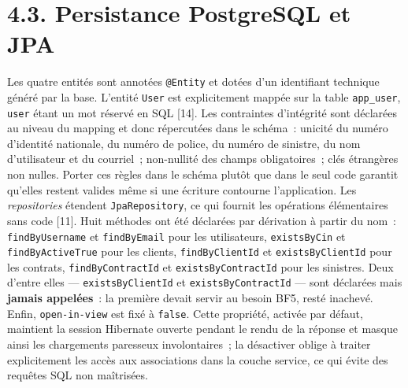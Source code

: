 \documentclass[12pt,a4paper]{report}
\begin{document}
\section*{4.3. Persistance PostgreSQL et JPA}
Les quatre entités sont annotées \texttt{@Entity} et dotées d'un identifiant technique généré par la base. L'entité \texttt{User} est explicitement mappée sur la table \texttt{app\_user}, \texttt{user} étant un mot réservé en SQL [14]. Les contraintes d'intégrité sont déclarées au niveau du mapping et donc répercutées dans le schéma~: unicité du numéro d'identité nationale, du numéro de police, du numéro de sinistre, du nom d'utilisateur et du courriel~; non-nullité des champs obligatoires~; clés étrangères non nulles. Porter ces règles dans le schéma plutôt que dans le seul code garantit qu'elles restent valides même si une écriture contourne l'application.
Les \textit{repositories} étendent \texttt{JpaRepository}, ce qui fournit les opérations élémentaires sans code [11]. Huit méthodes ont été déclarées par dérivation à partir du nom~: \texttt{findByUsername} et \texttt{findByEmail} pour les utilisateurs, \texttt{existsByCin} et \texttt{findByActiveTrue} pour les clients, \texttt{findByClientId} et \texttt{existsByClientId} pour les contrats, \texttt{findByContractId} et \texttt{existsByContractId} pour les sinistres. Deux d'entre elles — \texttt{existsByClientId} et \texttt{existsByContractId} — sont déclarées mais \textbf{jamais appelées}~: la première devait servir au besoin BF5, resté inachevé.
Enfin, \texttt{open-in-view} est fixé à \texttt{false}. Cette propriété, activée par défaut, maintient la session Hibernate ouverte pendant le rendu de la réponse et masque ainsi les chargements paresseux involontaires~; la désactiver oblige à traiter explicitement les accès aux associations dans la couche service, ce qui évite des requêtes SQL non maîtrisées.
\end{document}
